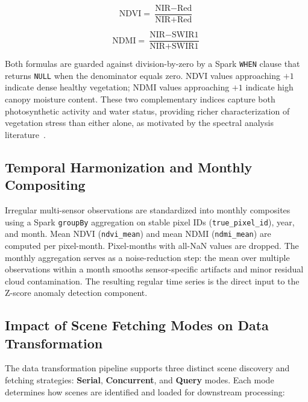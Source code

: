 \begin{equation}
\text{NDVI} = \frac{\text{NIR} - \text{Red}}{\text{NIR} + \text{Red}}
\end{equation}

\begin{equation}
\text{NDMI} = \frac{\text{NIR} - \text{SWIR1}}{\text{NIR} + \text{SWIR1}}
\end{equation}

Both formulas are guarded against division-by-zero by a Spark \texttt{WHEN} clause that returns \texttt{NULL} when the denominator equals zero. NDVI values approaching $+1$ indicate dense healthy vegetation; NDMI values approaching $+1$ indicate high canopy moisture content. These two complementary indices capture both photosynthetic activity and water status, providing richer characterization of vegetation stress than either alone, as motivated by the spectral analysis literature~\cite{carletti2025,konig2023}.

\subsection{Temporal Harmonization and Monthly Compositing}

Irregular multi-sensor observations are standardized into monthly composites using a Spark \texttt{groupBy} aggregation on stable pixel IDs (\texttt{true\_pixel\_id}), year, and month. Mean NDVI (\texttt{ndvi\_mean}) and mean NDMI (\texttt{ndmi\_mean}) are computed per pixel-month. Pixel-months with all-NaN values are dropped. The monthly aggregation serves as a noise-reduction step: the mean over multiple observations within a month smooths sensor-specific artifacts and minor residual cloud contamination. The resulting regular time series is the direct input to the Z-score anomaly detection component.

\subsection{Impact of Scene Fetching Modes on Data Transformation}

The data transformation pipeline supports three distinct scene discovery and fetching strategies: \textbf{Serial}, \textbf{Concurrent}, and \textbf{Query} modes. Each mode determines how scenes are identified and loaded for downstream processing:

